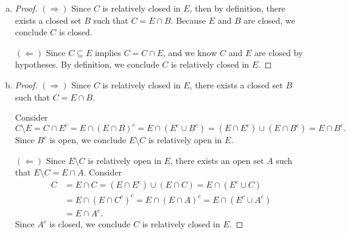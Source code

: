 \begin{Exercise}
\begin{enumerate}[a)]
\item
\begin{proof}
$(\Longrightarrow)$
Since $C$ is relatively closed in $E$, then by definition, there exists a closed set $B$ such that $C=E\cap B$. Because $E$ and $B$ are closed, we conclude $C$ is closed.

$(\Longleftarrow)$
Since $C\subseteq E$ implies $C=C\cap E$, and we know $C$ and $E$ are closed by hypotheses. By definition, we conclude $C$ is relatively closed in $E$.
\end{proof}

\item
\begin{proof}
$(\Longrightarrow)$
Since $C$ is relatively closed in $E$, there exists a closed set $B$ such that $C=E\cap B$.

Consider
$$
C\setminus E 
= C\cap E^c 
= E\cap \left(E\cap B \right)^c 
= E\cap \left( E^c\cup B^c \right) 
= \left( E\cap E^c\right) \cup \left( E \cap B^c\right)
= E\cap B^c.
$$
Since $B^c$ is open, we conclude $E\setminus C$ is relatively open in $E$.

$(\Longleftarrow)$
Since $E\setminus C$ is relatively open in $E$, there exists an open set $A$ such that $E\setminus C = E\cap A$. Consider
\begin{align*}
C
&= E\cap C
= \left( E\cap E^c \right) \cup \left(E \cap C\right)
= E\cap \left( E^c \cup C \right) \\
&= E\cap \left( E\cap C^c \right)^c
= E\cap \left( E\cap A \right)^c
= E\cap \left( E^c \cup A^c \right) \\
&= E \cap A^c.
\end{align*}
Since $A^c$ is closed, we conclude $C$ is relatively closed in $E$.
\end{proof}

\end{enumerate}
\end{Exercise}